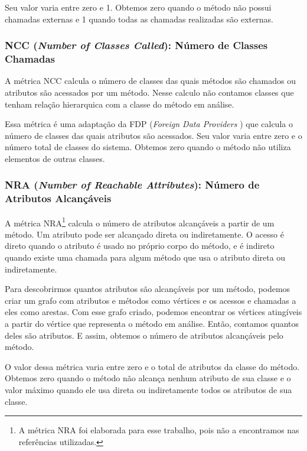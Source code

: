 Seu valor varia entre zero e 1. Obtemos zero quando o método não possui chamadas externas e 1 quando todas as chamadas realizadas são externas.


\subsubsection{NCC (\textit{Number of Classes Called}): Número de Classes Chamadas}              

A métrica NCC calcula o número de classes das quais métodos são chamados ou atributos são acessados por um método. Nesse calculo não contamos classes que tenham relação hierarquica  com a classe do método em análise.

Essa métrica é uma adaptação da FDP (\textit{Foreign Data Providers} \citep{Lanza06}) que calcula o número de classes das quais atributos são acessados. Seu valor varia entre zero e o número total de classes do sistema. Obtemos zero quando o método não utiliza elementos de outras classes.
                                                                 

\subsubsection{NRA (\textit{Number of Reachable Attributes}): Número de Atributos Alcançáveis}

A métrica NRA\footnote{A métrica NRA foi elaborada para esse trabalho, pois não a encontramos nas referências utilizadas.} calcula o número de atributos alcançáveis a partir de um método. Um atributo pode ser alcançado direta ou indiretamente. O acesso é direto quando o atributo é usado no próprio corpo do método, e é indireto quando existe uma chamada para algum método que usa o atributo direta ou indiretamente.
 	          
Para descobrirmos quantos atributos são alcançáveis por um método, podemos criar um grafo com atributos e métodos como vértices e os acessos e chamadas a eles como arestas. Com esse grafo criado, podemos encontrar os vértices atingíveis a partir do vértice que representa o método em análise. Então, contamos quantos deles são atributos. E assim, obtemos o número de atributos alcançáveis pelo método.

O valor dessa métrica varia entre zero e o total de atributos da classe do método. Obtemos zero quando o método não alcança nenhum atributo de sua classe e o valor máximo quando ele usa direta ou indiretamente todos os atributos de sua classe.


